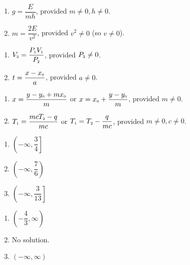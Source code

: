 \documentclass{ximera}
\begin{document}
\begin{multicols}{2}
\begin{enumerate}
\setcounter{enumi}{\value{HW}}
\item $g = \dfrac{E}{mh}$, provided $m \neq 0, h \neq 0$.
\item $m = \dfrac{2E}{v^2}$, provided $v^2 \neq 0$ (so $v \neq 0$).
\setcounter{HW}{\value{enumi}}
\end{enumerate}
\end{multicols}


\begin{multicols}{2}
\begin{enumerate}
\setcounter{enumi}{\value{HW}}
\item $V_{\text{\tiny $2$}} = \dfrac{P_{\text{\tiny $1$}}V_{\text{\tiny $1$}}}{P_{\text{\tiny $2$}}}$, provided $P_{\text{\tiny $2$}} \neq 0$. 
\item $t = \dfrac{x - x_{\text{\tiny $0$}}}{a}$, provided $a \neq 0$.
\setcounter{HW}{\value{enumi}}
\end{enumerate}
\end{multicols}


\begin{enumerate}
\setcounter{enumi}{\value{HW}}
\item $x = \dfrac{y-y_{\text{\tiny $0$}} + mx_{\text{\tiny $0$}}}{m}$ or $x = x_{\text{\tiny $0$}} + \dfrac{y-y_{\text{\tiny $0$}}}{m}$, provided $m \neq 0$. 
\item $T_{\text{\tiny $1$}} = \dfrac{mcT_{\text{\tiny $2$}} - q}{mc}$ or $T_{\text{\tiny $1$}} = T_{\text{\tiny $2$}} - \dfrac{q}{mc} $, provided $m \neq 0, c \neq 0$.  
\setcounter{HW}{\value{enumi}}
\end{enumerate}


\begin{multicols}{3}
\begin{enumerate}
\setcounter{enumi}{\value{HW}}
\addtocounter{enumi}{1}
\item $\left(-\infty, \dfrac{3}{4}\right]$
\item $\left(-\infty, \dfrac{7}{6} \right)$  
\item  $\left( -\infty,  \dfrac{3}{13}\right]$

\setcounter{HW}{\value{enumi}}
\end{enumerate}
\end{multicols}

\begin{multicols}{3}
\begin{enumerate}
\setcounter{enumi}{\value{HW}}

\item $\left(-\dfrac{4}{3}, \infty\right)$
\item No solution.
\item $(-\infty, \infty)$

\setcounter{HW}{\value{enumi}}
\end{enumerate}
\end{multicols}
\end{document}
